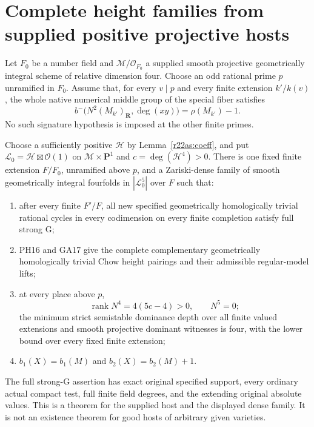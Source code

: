\section{Complete height families from supplied positive projective hosts}
\label{r22phs:section}

\begin{theorem}
\label{r22phs:theorem}
Let $F_0$ be a number field and
$\mathcal M/\mathcal O_{F_0}$ a supplied smooth
projective geometrically integral scheme of
relative dimension four.  Choose an odd
rational prime $p$ unramified in $F_0$.
Assume that, for every $v\mid p$ and every
finite extension $k'/k(v)$, the whole native
numerical middle group of the special fiber
satisfies
\[
 b^-\bigl(N^2(M_{k'})_{\mathbf R},\deg(xy)\bigr)
                            =\rho(M_{k'})-1.
 \tag{PSH22.1}\label{r22phs:positivity}
\]
No such signature hypothesis is imposed at
the other finite primes.

Choose a sufficiently positive $\mathcal H$
by Lemma~\ref{r22as:coeff}, and put
$\mathcal L_0=\mathcal H\boxtimes\mathcal O(1)$
on $\mathcal M\times\mathbf P^1$ and
$c=\deg(\mathcal H^4)>0$.
There is one fixed finite extension $F/F_0$,
unramified above $p$, and a Zariski-dense
family of smooth geometrically integral
fourfolds in $|\mathcal L_0^5|$ over $F$
such that:
\begin{enumerate}
\item after every finite $F'/F$, all new
specified geometrically homologically trivial
rational cycles in every codimension on every
finite completion satisfy full strong G;
\item PH16 and GA17 give the complete
complementary geometrically homologically
trivial Chow height pairings and their
admissible regular-model lifts;
\item at every place above $p$,
\[
            \operatorname{rank}N^4=4(5c-4)>0,
                  \qquad N^5=0;
 \tag{PSH22.2}\label{r22phs:rank}
\]
the minimum strict semistable dominance depth
over all finite valued extensions and
smooth projective dominant witnesses is
four, with the lower bound over every fixed
finite extension;
\item $b_1(X)=b_1(M)$ and
$b_2(X)=b_2(M)+1$.
\end{enumerate}
The full strong-G assertion has exact original
specified support, every ordinary actual
compact test, full finite field degrees, and
the extending original absolute values.
This is a theorem for the supplied host
and the displayed dense family.  It is
not an existence theorem for good hosts
of arbitrary given varieties.
\end{theorem}

